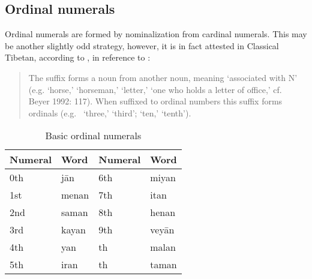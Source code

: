 \subsection{Ordinal numerals}

Ordinal numerals are formed by nominalization from cardinal numerals. This may 
be another slightly odd strategy, however, it is in fact attested in Classical 
Tibetan, according to \citet{chungetal2014}, in reference to \citet{beyer1992}:

\blockcquote[626]{chungetal2014}{The suffix  forms a noun from another 
noun, meaning `associated with N' (e.g.  `horse,'  
`horseman,'  `letter,'  `one who holds a letter of 
office,' cf.\ \nocite{beyer1992} Beyer 1992: 117). When suffixed to ordinal 
numbers this suffix forms ordinals (e.g.\  `three,'  
`third';  `ten,'  `tenth').}

\begin{table}\centering
\caption{Basic ordinal numerals}
\begin{tabu} to .75\linewidth {X[c] I X[c] I}
\toprule\tableheaderfont
Numeral
	& Word
	& Numeral
	& Word
	\\
\toprule

0th
	& jān %
	& 6th
	& miyan %
	\\

1st
	& menan %
	& 7th
	& itan %
	\\
	
2nd
	& saman %
	& 8th
	& henan %
	\\
	
3rd
	& kayan %
	& 9th
	& veyān %
	\\

4th
	& yan %
	& \ten{}th
	& malan %
	\\

5th
	& iran %
	& \elv{}th
	& taman %
	\\

\bottomrule
\end{tabu}
\label{tab:ordinals}
\end{table}

